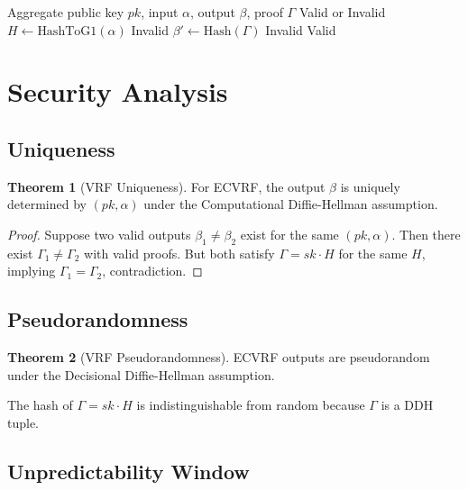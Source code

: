 \documentclass[11pt,a4paper]{article}
\theoremstyle{definition}
\newtheorem{theorem}{Theorem}
\begin{document}
\begin{algorithm}
\caption{BLS-DVRF Verify}
\begin{algorithmic}[1]
\Require Aggregate public key $pk$, input $\alpha$, output $\beta$, proof $\Gamma$
\Ensure Valid or Invalid
\State $H \gets \text{HashToG1}(\alpha)$
    \Return Invalid
\EndIf
\State $\beta' \gets \text{Hash}(\Gamma)$
    \Return Invalid
\EndIf
\Return Valid
\end{algorithmic}
\end{algorithm}

\section{Security Analysis}

\subsection{Uniqueness}

\begin{theorem}[VRF Uniqueness]
For ECVRF, the output $\beta$ is uniquely determined by $(pk, \alpha)$ under the Computational Diffie-Hellman assumption.
\end{theorem}

\begin{proof}
Suppose two valid outputs $\beta_1 \neq \beta_2$ exist for the same $(pk, \alpha)$. Then there exist $\Gamma_1 \neq \Gamma_2$ with valid proofs. But both satisfy $\Gamma = sk \cdot H$ for the same $H$, implying $\Gamma_1 = \Gamma_2$, contradiction.
\end{proof}

\subsection{Pseudorandomness}

\begin{theorem}[VRF Pseudorandomness]
ECVRF outputs are pseudorandom under the Decisional Diffie-Hellman assumption.
\end{theorem}

The hash of $\Gamma = sk \cdot H$ is indistinguishable from random because $\Gamma$ is a DDH tuple.

\subsection{Unpredictability Window}
\end{document}
